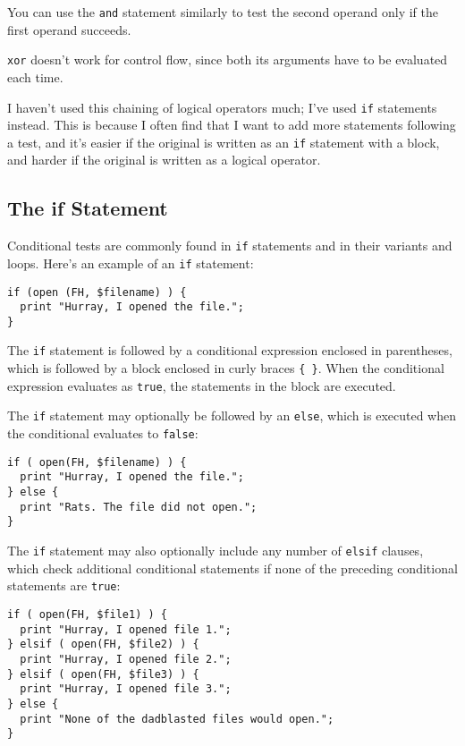 You can use the \verb|and| statement similarly to test the second operand only if the first operand succeeds.

\verb|xor| doesn't work for control flow, since both its arguments have to be evaluated each time.

I haven't used this chaining of logical operators much; I've used \verb|if| statements instead. This is because I often find that I want to add more statements following a test, and it's easier if the original is written as an \verb|if| statement with a block, and harder if the original is written as a logical operator.

\subsection{The if Statement}
Conditional tests are commonly found in \verb|if| statements and in their variants and loops. Here's an example of an \verb|if| statement:

\begin{lstlisting}
if (open (FH, $filename) ) {
  print "Hurray, I opened the file.";
}
\end{lstlisting}

The \verb|if| statement is followed by a conditional expression enclosed in parentheses, which is followed by a block enclosed in curly braces \verb|{ }|. When the conditional expression evaluates as \verb|true|, the statements in the block are executed.

The \verb|if| statement may optionally be followed by an \verb|else|, which is executed when the conditional evaluates to \verb|false|:

\begin{lstlisting}
if ( open(FH, $filename) ) {
  print "Hurray, I opened the file.";
} else {
  print "Rats. The file did not open.";
}
\end{lstlisting}

The \verb|if| statement may also optionally include any number of \verb|elsif| clauses, which check additional conditional statements if none of the preceding conditional statements are \verb|true|:

\begin{lstlisting}
if ( open(FH, $file1) ) {
  print "Hurray, I opened file 1.";
} elsif ( open(FH, $file2) ) {
  print "Hurray, I opened file 2.";
} elsif ( open(FH, $file3) ) {
  print "Hurray, I opened file 3.";
} else {
  print "None of the dadblasted files would open.";
}
\end{lstlisting}

